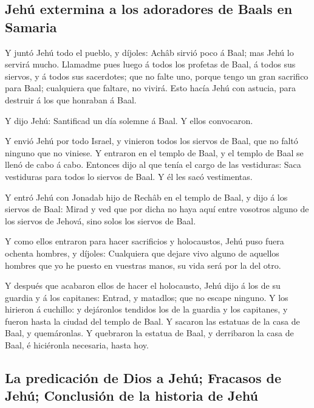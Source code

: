 \hypertarget{jehuxfa-extermina-a-los-adoradores-de-baals-en-samaria}{%
\subsection{Jehú extermina a los adoradores de Baals en
Samaria}\label{jehuxfa-extermina-a-los-adoradores-de-baals-en-samaria}}

 Y juntó Jehú todo el pueblo, y díjoles: Achâb sirvió
poco á Baal; mas Jehú lo servirá mucho.  Llamadme pues
luego á todos los profetas de Baal, á todos sus siervos, y á todos sus
sacerdotes; que no falte uno, porque tengo un gran sacrifico para Baal;
cualquiera que faltare, no vivirá. Esto hacía Jehú con astucia, para
destruir á los que honraban á Baal.

 Y dijo Jehú: Santificad un día solemne á Baal. Y ellos
convocaron.

 Y envió Jehú por todo Israel, y vinieron todos los
siervos de Baal, que no faltó ninguno que no viniese. Y entraron en el
templo de Baal, y el templo de Baal se llenó de cabo á cabo.
 Entonces dijo al que tenía el cargo de las vestiduras:
Saca vestiduras para todos lo siervos de Baal. Y él les sacó
vestimentas.

 Y entró Jehú con Jonadab hijo de Rechâb en el templo de
Baal, y dijo á los siervos de Baal: Mirad y ved que por dicha no haya
aquí entre vosotros alguno de los siervos de Jehová, sino solos los
siervos de Baal.

 Y como ellos entraron para hacer sacrificios y
holocaustos, Jehú puso fuera ochenta hombres, y díjoles: Cualquiera que
dejare vivo alguno de aquellos hombres que yo he puesto en vuestras
manos, su vida será por la del otro.

 Y después que acabaron ellos de hacer el holocausto,
Jehú dijo á los de su guardia y á los capitanes: Entrad, y matadlos; que
no escape ninguno. Y los hirieron á cuchillo: y dejáronlos tendidos los
de la guardia y los capitanes, y fueron hasta la ciudad del templo de
Baal.  Y sacaron las estatuas de la casa de Baal, y
quemáronlas.  Y quebraron la estatua de Baal, y
derribaron la casa de Baal, é hiciéronla necesaria, hasta hoy.

\hypertarget{la-predicaciuxf3n-de-dios-a-jehuxfa-fracasos-de-jehuxfa-conclusiuxf3n-de-la-historia-de-jehuxfa}{%
\subsection{La predicación de Dios a Jehú; Fracasos de Jehú; Conclusión
de la historia de
Jehú}\label{la-predicaciuxf3n-de-dios-a-jehuxfa-fracasos-de-jehuxfa-conclusiuxf3n-de-la-historia-de-jehuxfa}}

